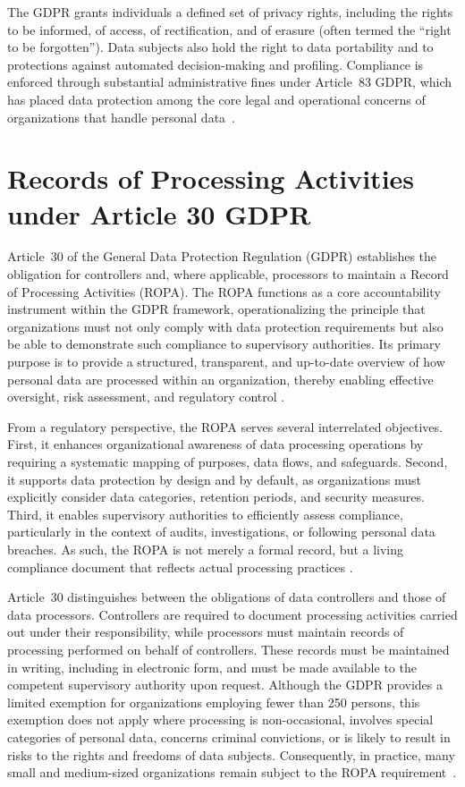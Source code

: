 The GDPR grants individuals a defined set of privacy rights, including the rights to be informed, of access, of rectification, and of erasure (often termed the ``right to be forgotten''). Data subjects also hold the right to data portability and to protections against automated decision-making and profiling. Compliance is enforced through substantial administrative fines under Article~83 GDPR, which has placed data protection among the core legal and operational concerns of organizations that handle personal data~\cite{gdpr-eu-overview}.


\bigskip
\bigskip
\bigskip
\section{Records of Processing Activities under Article 30 GDPR}

Article~30 of the General Data Protection Regulation (GDPR) establishes the obligation for controllers and, where applicable, processors to maintain a Record of Processing Activities (ROPA). The ROPA functions as a core accountability instrument within the GDPR framework, operationalizing the principle that organizations must not only comply with data protection requirements but also be able to demonstrate such compliance to supervisory authorities. Its primary purpose is to provide a structured, transparent, and up-to-date overview of how personal data are processed within an organization, thereby enabling effective oversight, risk assessment, and regulatory control \cite{gdpr-info-art30, schwerinSystematicComparisonOpen2024}.

\bigskip
From a regulatory perspective, the ROPA serves several interrelated objectives. First, it enhances organizational awareness of data processing operations by requiring a systematic mapping of purposes, data flows, and safeguards. Second, it supports data protection by design and by default, as organizations must explicitly consider data categories, retention periods, and security measures. Third, it enables supervisory authorities to efficiently assess compliance, particularly in the context of audits, investigations, or following personal data breaches. As such, the ROPA is not merely a formal record, but a living compliance document that reflects actual processing practices \cite{gdpr-info-art30}.

Article~30 distinguishes between the obligations of data controllers and those of data processors. Controllers are required to document processing activities carried out under their responsibility, while processors must maintain records of processing performed on behalf of controllers. These records must be maintained in writing, including in electronic form, and must be made available to the competent supervisory authority upon request. Although the GDPR provides a limited exemption for organizations employing fewer than 250 persons, this exemption does not apply where processing is non-occasional, involves special categories of personal data, concerns criminal convictions, or is likely to result in risks to the rights and freedoms of data subjects. Consequently, in practice, many small and medium-sized organizations remain subject to the ROPA requirement~\cite{gdpr-info-art30}.

